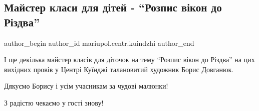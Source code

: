  
 
 
 
 

\subsection{Майстер класи для дітей - \enquote{Розпис вікон до Різдва}}
\label{sec:24_12_2019.fb.mariupol.centr.kuindzhi.1.majster_klassy_dlja_ditej_rozpys_vikon_do_rizdva}

\ifcmt
 author_begin
   author_id mariupol.centr.kuindzhi
 author_end
\fi

І ще декілька майстер класів для діточок на тему \enquote{Розпис вікон до Різдва}  на
цих вихідних провів у Центрі Куїнджі талановитий художник Борис Довганюк.

Дякуємо Борису і усім учасникам за чудові малюнки!

З радістю чекаємо у гості знову!
